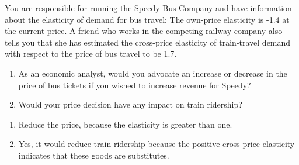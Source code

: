 \begin{enumialphparenastyle}
\begin{econex}\label{ex:ch4ex7}
You are responsible for running the Speedy Bus Company and have information about the elasticity of demand for bus travel: The own-price elasticity is -1.4 at the current price. A friend who works in the competing railway company also tells you that she has estimated the cross-price elasticity of train-travel demand with respect to the price of bus travel to be 1.7.
\begin{enumerate}
\item	As an economic analyst, would you advocate an increase or decrease in the price of bus tickets if you wished to increase revenue for Speedy?
\item	Would your price decision have any impact on train ridership?
\end{enumerate}
\begin{econsolution}
\begin{enumerate}
\item	Reduce the price, because the elasticity is greater than one.
\item	Yes, it would reduce train ridership because the positive cross-price elasticity indicates that these goods are substitutes.
\end{enumerate}
\end{econsolution}
\end{econex}


\end{enumialphparenastyle}
